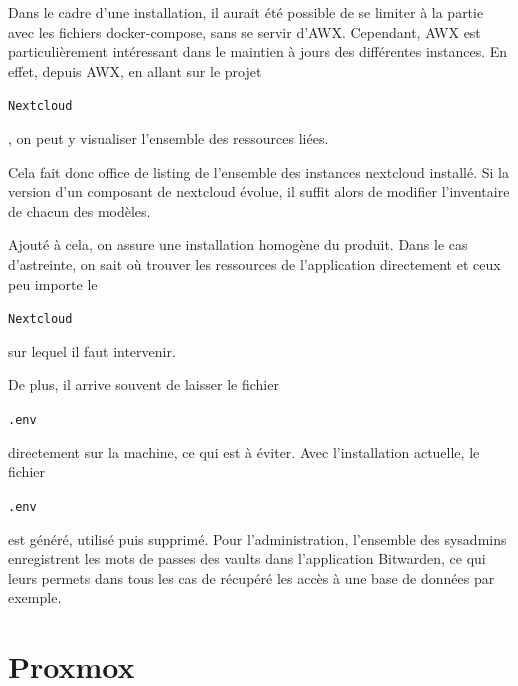 \documentclass[12pt]{article}
\begin{document}
Dans le cadre d'une installation, il aurait été possible de se limiter à la partie avec les fichiers docker-compose, sans se servir d'AWX. 
Cependant, AWX est particulièrement intéressant dans le maintien à jours des différentes instances. 
En effet, depuis AWX, en allant sur le projet \begin{code}\texttt{\gls{Nextcloud}}\end{code}, on peut y visualiser l'ensemble des ressources liées.

Cela fait donc office de listing de l'ensemble des instances nextcloud installé. 
Si la version d'un composant de nextcloud évolue, il suffit alors de modifier l'inventaire de chacun des modèles.

Ajouté à cela, on assure une installation homogène du produit. 
Dans le cas d'astreinte, on sait où trouver les ressources de l'application directement et ceux peu importe le \begin{code}\texttt{\gls{Nextcloud}}\end{code} sur lequel il faut intervenir.

De plus, il arrive souvent de laisser le fichier \begin{code}\texttt{.env}\end{code} directement sur la machine, ce qui est à éviter. 
Avec l'installation actuelle, le fichier \begin{code}\texttt{.env}\end{code} est généré, utilisé puis supprimé. 
Pour l'administration, l'ensemble des sysadmins enregistrent les mots de passes des vaults dans l'application Bitwarden, ce qui leurs permets dans tous les cas de récupéré les accès à une base de données par exemple.

\newpage
\section{Proxmox}
\end{document}
